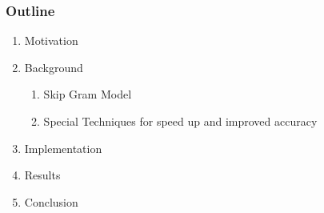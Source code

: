 \begin{frame}\frametitle{Outline}
\begin{enumerate}
\item Motivation
\item Background
\begin{enumerate}
\item Skip Gram Model
\item Special Techniques for speed up and improved accuracy
\end{enumerate}
\item Implementation
\item Results
\item Conclusion
\end{enumerate}
	
\end{frame}